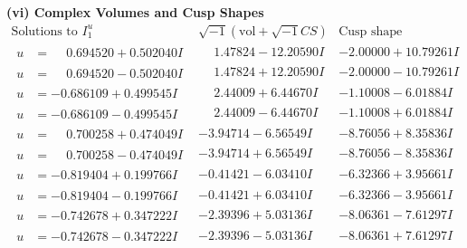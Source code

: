 \documentclass[1p]{elsarticle_modified}
\theoremstyle{definition}
\newcommand{\I}{\sqrt{-1}}
\begin{document}
\newpage\flushleft \textbf{(vi) Complex Volumes and Cusp Shapes}
$$\begin{array}{c|c|c}  
\text{Solutions to }I^u_{1}& \I (\text{vol} + \sqrt{-1}CS) & \text{Cusp shape}\\
 \hline 
\begin{aligned}
u &= \phantom{-}0.694520 + 0.502040 I\end{aligned}
 & \phantom{-}1.47824 - 12.20590 I & -2.00000 + 10.79261 I \\ \hline\begin{aligned}
u &= \phantom{-}0.694520 - 0.502040 I\end{aligned}
 & \phantom{-}1.47824 + 12.20590 I & -2.00000 - 10.79261 I \\ \hline\begin{aligned}
u &= -0.686109 + 0.499545 I\end{aligned}
 & \phantom{-}2.44009 + 6.44670 I & -1.10008 - 6.01884 I \\ \hline\begin{aligned}
u &= -0.686109 - 0.499545 I\end{aligned}
 & \phantom{-}2.44009 - 6.44670 I & -1.10008 + 6.01884 I \\ \hline\begin{aligned}
u &= \phantom{-}0.700258 + 0.474049 I\end{aligned}
 & -3.94714 - 6.56549 I & -8.76056 + 8.35836 I \\ \hline\begin{aligned}
u &= \phantom{-}0.700258 - 0.474049 I\end{aligned}
 & -3.94714 + 6.56549 I & -8.76056 - 8.35836 I \\ \hline\begin{aligned}
u &= -0.819404 + 0.199766 I\end{aligned}
 & -0.41421 - 6.03410 I & -6.32366 + 3.95661 I \\ \hline\begin{aligned}
u &= -0.819404 - 0.199766 I\end{aligned}
 & -0.41421 + 6.03410 I & -6.32366 - 3.95661 I \\ \hline\begin{aligned}
u &= -0.742678 + 0.347222 I\end{aligned}
 & -2.39396 + 5.03136 I & -8.06361 - 7.61297 I \\ \hline\begin{aligned}
u &= -0.742678 - 0.347222 I\end{aligned}
 & -2.39396 - 5.03136 I & -8.06361 + 7.61297 I \\ \hline\begin{aligned}

\end{aligned}
\end{array}$$
\end{document}

